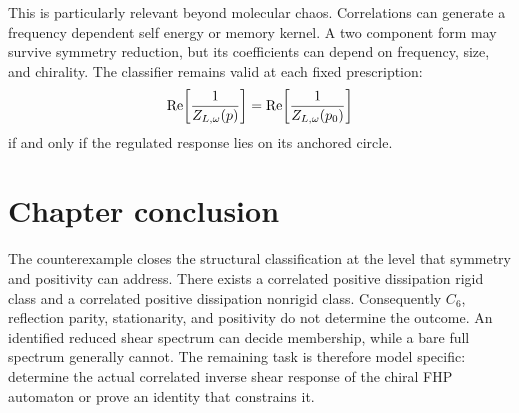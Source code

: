 This is particularly relevant beyond molecular chaos. Correlations can generate a frequency dependent self energy or memory kernel. A two component form may survive symmetry reduction, but its coefficients can depend on frequency, size, and chirality. The classifier remains valid at each fixed prescription:
\begin{equation}
 \operatorname{Re}\!\left[\frac1{Z_{L,\omega}(p)}\right]
 =\operatorname{Re}\!\left[\frac1{Z_{L,\omega}(p_0)}\right]
 \label{eq:regulated_classifier}
\end{equation}
if and only if the regulated response lies on its anchored circle.

\section{Chapter conclusion}
The counterexample closes the structural classification at the level that symmetry and positivity can address. There exists a correlated positive dissipation rigid class and a correlated positive dissipation nonrigid class. Consequently $C_6$, reflection parity, stationarity, and positivity do not determine the outcome. An identified reduced shear spectrum can decide membership, while a bare full spectrum generally cannot. The remaining task is therefore model specific: determine the actual correlated inverse shear response of the chiral FHP automaton or prove an identity that constrains it.
